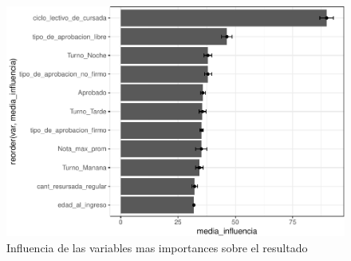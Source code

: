 \begin{figure}[!htb]
	\centering
	\includegraphics{imagenes/variables/influencia_de_variables-1.pdf}
	\caption{Influencia de las variables mas importances sobre el resultado}
	\label{fig:rfe_influencia_var}
\end{figure}

\clearpage

